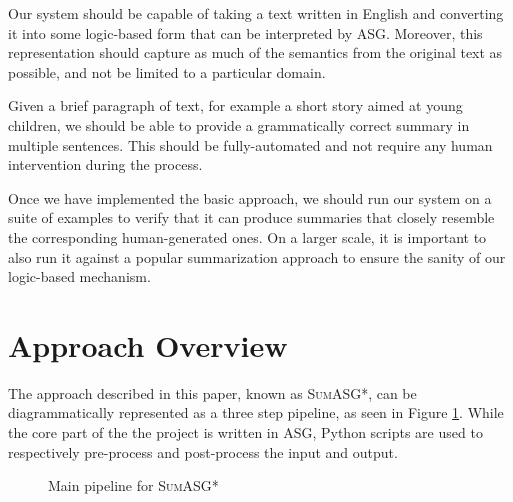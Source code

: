 \begin{objective}
Our system should be capable of taking a text written in English and converting it into some logic-based form that can be interpreted by ASG. Moreover, this representation should capture as much of the semantics from the original text as possible, and not be limited to a particular domain.
\end{objective}

\begin{objective}
Given a brief paragraph of text, for example a short story aimed at young children, we should be able to provide a grammatically correct summary in multiple sentences. This should be fully-automated and not require any human intervention during the process.
\end{objective}

\begin{objective}
Once we have implemented the basic approach, we should run our system on a suite of examples to verify that it can produce summaries that closely resemble the corresponding human-generated ones. On a larger scale, it is important to also run it against a popular summarization approach to ensure the sanity of our logic-based mechanism.
\end{objective}

\section{Approach Overview}
\label{sec:approach_overview}

The approach described in this paper, known as \textsc{SumASG*}, can be diagrammatically represented as a three step pipeline, as seen in Figure \ref{fig:main_pipeline}. While the core part of the the project is written in ASG, Python scripts are used to respectively pre-process and post-process the input and output.

{
\begin{figure}[H]
\centering
{}
\caption{Main pipeline for \textsc{SumASG*}}
\label{fig:main_pipeline}
\end{figure}
}

